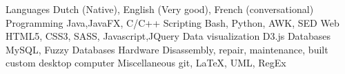 \begin{cvskills}
  \cvskill
    {Languages}
    {Dutch (Native), English (Very good), French (conversational) }
  \cvskill
    {Programming}
    {Java,JavaFX, C/C++}
  \cvskill
    {Scripting}
    {Bash, Python, AWK, SED}
  \cvskill
    {Web}
    {HTML5, CSS3, SASS, Javascript,JQuery}
  \cvskill
    {Data visualization}
    {D3.js}
  \cvskill
    {Databases}
    {MySQL, Fuzzy Databases}
  \cvskill
    {Hardware}
    {Disassembly, repair, maintenance, built custom desktop computer}
  \cvskill
    {Miscellaneous}
    {git, \LaTeX, UML, RegEx}
\end{cvskills}
